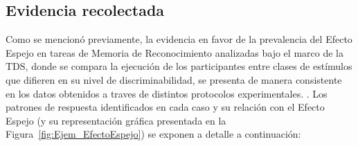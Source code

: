 \subsection{Evidencia recolectada}

Como se mencionó previamente, la evidencia en favor de la prevalencia del Efecto Espejo en tareas de Memoria de Reconocimiento analizadas bajo el marco de la TDS, donde se compara la ejecución de los participantes entre clases de estímulos que difieren en su nivel de discriminabilidad, se presenta de manera consistente en los datos obtenidos a traves de distintos protocolos experimentales. \parencite{Glanzer1990, Glanzer1993}. Los patrones de respuesta identificados en cada caso y su relación con el Efecto Espejo (y su representación gráfica presentada en la Figura~\ref{fig:Ejem_EfectoEspejo}) se exponen a detalle a continuación:\\

